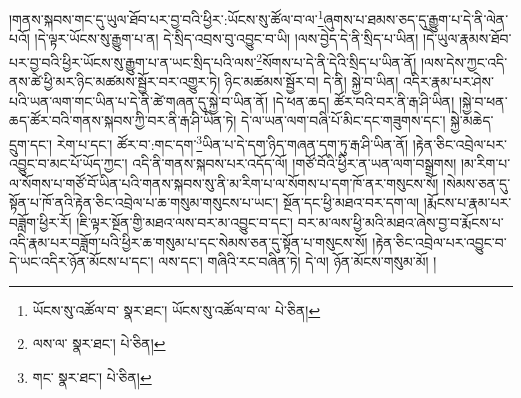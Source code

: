 །གནས་སྐབས་གང་དུ་ཡུལ་ཐོབ་པར་བྱ་བའི་ཕྱིར་:ཡོངས་སུ་ཚོལ་བ་ལ་\footnote{ཡོངས་སུ་འཚོལ་བ་  སྣར་ཐང་། ཡོངས་སུ་འཚོལ་བ་ལ་  པེ་ཅིན། }ཞུགས་པ་ཐམས་ཅད་དུ་རྒྱུག་པ་དེ་ནི་ལེན་པའོ། །དེ་ལྟར་ཡོངས་སུ་རྒྱུག་པ་ན། དེ་སྲིད་འབྲས་བུ་འབྱུང་བ་ཡི། །ལས་བྱེད་དེ་ནི་སྲིད་པ་ཡིན། །དེ་ཡུལ་རྣམས་ཐོབ་པར་བྱ་བའི་ཕྱིར་ཡོངས་སུ་རྒྱུག་པ་ན་ཡང་སྲིད་པའི་ལས་\footnote{ལས་ལ་  སྣར་ཐང་།  པེ་ཅིན། }སོགས་པ་དེ་ནི་དེའི་སྲིད་པ་ཡིན་ནོ། །ལས་དེས་ཀྱང་འདི་ནས་ཚེ་ཕྱི་མར་ཉིང་མཚམས་སྦྱོར་བར་འགྱུར་ཏེ། ཉིང་མཚམས་སྦྱོར་བ། དེ་ནི། སྐྱེ་བ་ཡིན། འདིར་རྣམ་པར་ཤེས་པའི་ཡན་ལག་གང་ཡིན་པ་དེ་ནི་ཚེ་གཞན་དུ་སྐྱེ་བ་ཡིན་ནོ། །དེ་ཕན་ཆད། ཚོར་བའི་བར་ནི་རྒ་ཤི་ཡིན། །སྐྱེ་བ་ཕན་ཆད་ཚོར་བའི་གནས་སྐབས་ཀྱི་བར་ནི་རྒ་ཤི་ཡིན་ཏེ། དེ་ལ་ཡན་ལག་བཞི་པོ་མིང་དང་གཟུགས་དང་། སྐྱེ་མཆེད་དྲུག་དང་། རེག་པ་དང་། ཚོར་བ་:གང་དག་\footnote{གང་  སྣར་ཐང་།  པེ་ཅིན། }ཡིན་པ་དེ་དག་ཉིད་གཞན་དག་ཏུ་རྒ་ཤི་ཡིན་ནོ། །རྟེན་ཅིང་འབྲེལ་པར་འབྱུང་བ་མང་པོ་ཡོད་ཀྱང་། འདི་ནི་གནས་སྐབས་པར་འདོད་ལོ། །གཙོ་བོའི་ཕྱིར་ན་ཡན་ལག་བསྒྲགས། །མ་རིག་པ་ལ་སོགས་པ་གཙོ་བོ་ཡིན་པའི་གནས་སྐབས་སུ་ནི་མ་རིག་པ་ལ་སོགས་པ་དག་ཁོ་ནར་གསུངས་སོ། །སེམས་ཅན་དུ་སྟོན་པ་ཁོ་ནའི་རྟེན་ཅིང་འབྲེལ་པ་ཆ་གསུམ་གསུངས་པ་ཡང་། སྔོན་དང་ཕྱི་མཐའ་བར་དག་ལ། །རྨོངས་པ་རྣམ་པར་བཟློག་ཕྱིར་རོ། །ཇི་ལྟར་སྔོན་གྱི་མཐའ་ལས་བར་མ་འབྱུང་བ་དང་། བར་མ་ལས་ཕྱི་མའི་མཐའ་ཞེས་བྱ་བ་རྨོངས་པ་འདི་རྣམ་པར་བཟློག་པའི་ཕྱིར་ཆ་གསུམ་པ་དང་སེམས་ཅན་དུ་སྟོན་པ་གསུངས་སོ། །རྟེན་ཅིང་འབྲེལ་པར་འབྱུང་བ་དེ་ཡང་འདིར་ཉོན་མོངས་པ་དང་། ལས་དང་། གཞིའི་རང་བཞིན་ཏེ། དེ་ལ། ཉོན་མོངས་གསུམ་མོ། །
